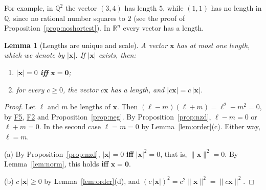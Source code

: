 \documentclass[11pt]{article}
\newcommand{\axF}[1]{\hyperref[ax:F#1]{F#1}}
\theoremstyle{plain}
\newtheorem{lemma}[theorem]{Lemma}
\theoremstyle{definition}
\theoremstyle{remark}
\begin{document}
For example, in $\mathbb{Q}^2$ the vector $(3,4)$ has length $5$, while $(1,1)$ has no length in $\mathbb{Q}$, since no rational number squares to $2$ (see the proof of Proposition~\ref{prop:noshortest}). In $\mathbb{R}^n$ every vector has a length.

\begin{lemma}[Lengths are unique and scale]\label{lem:length}
A vector $\mathbf{x}$ has at most one length, which we denote by $|\mathbf{x}|$. If $|\mathbf{x}|$ exists, then:
\begin{enumerate}
    \item[(a)] $|\mathbf{x}| = 0$ \textbf{iff} $\mathbf{x} = \mathbf{0}$;
    \item[(b)] for every $c \geq 0$, the vector $c\mathbf{x}$ has a length, and $|c\mathbf{x}| = c\,|\mathbf{x}|$.
\end{enumerate}
\end{lemma}
\begin{proof}
Let $\ell$ and $m$ be lengths of $\mathbf{x}$. Then $(\ell - m)(\ell + m) = \ell^2 - m^2 = 0$, by \axF{5}, \axF{2} and Proposition~\ref{prop:neg}. By Proposition~\ref{prop:nzd}, $\ell - m = 0$ or $\ell + m = 0$. In the second case $\ell = m = 0$ by Lemma~\ref{lem:order}(c). Either way, $\ell = m$.

(a) By Proposition~\ref{prop:nzd}, $|\mathbf{x}| = 0$ \textbf{iff} $|\mathbf{x}|^2 = 0$, that is, $\|\mathbf{x}\|^2 = 0$. By Lemma~\ref{lem:norm}, this holds \textbf{iff} $\mathbf{x} = \mathbf{0}$.

(b) $c\,|\mathbf{x}| \geq 0$ by Lemma~\ref{lem:order}(d), and $(c\,|\mathbf{x}|)^2 = c^2 \|\mathbf{x}\|^2 = \|c\mathbf{x}\|^2$.
\end{proof}
\end{document}
